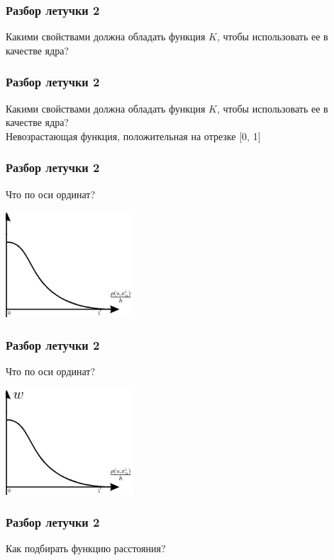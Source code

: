 \documentclass[12pt]{beamer}
\begin{document}
\begin{frame}\frametitle{Разбор летучки 2}
Какими свойствами должна обладать функция $K$, чтобы использовать ее в качестве ядра?
\end{frame}

\begin{frame}\frametitle{Разбор летучки 2}
Какими свойствами должна обладать функция $K$, чтобы использовать ее в качестве ядра?\\
\vspace{5mm}
Невозрастающая функция, положительная на отрезке [0, 1]
\end{frame}

\begin{frame}\frametitle{Разбор летучки 2}
      Что по оси ординат? \\
   \begin{minipage}[t]{0.35\linewidth}

	\includegraphics[height=150px]{parzen}
   \end{minipage}
\end{frame}

\begin{frame}\frametitle{Разбор летучки 2}
      Что по оси ординат? \\
   \begin{minipage}[t]{0.35\linewidth}

	\includegraphics[height=150px]{parzen1}
   \end{minipage}
\end{frame}

\begin{frame}\frametitle{Разбор летучки 2}
Как подбирать функцию расстояния?
\end{frame}
 
\end{document}

